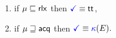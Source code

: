 \begin{figure}
\begin{multicols}{2}
\begin{enumerate}[topsep=0pt,label=(\textsc{r}\arabic*),ref=\textsc{r}\arabic*]
\begin{enumerate}[leftmargin=0pt]
      \item \label{read-term-nonempty}
        if $\mu\sqsubseteq{\mathsf{rlx}}$ then $\aTerm \riff \TRUE$,
      \item \label{read-term-empty}
        if $\mu\sqsupseteq{\mathsf{acq}}$ then
        \begin{math}
          \aTerm \riff
          \kappaE{}. %
        \end{math}
      \end{enumerate}      
    \end{enumerate}
  \end{multicols}
  \medskip


\end{figure}
